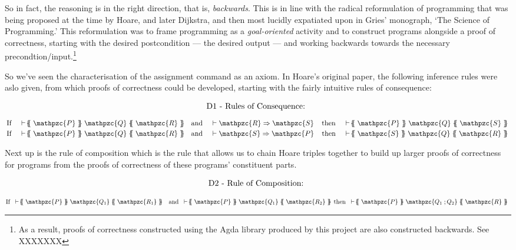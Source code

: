 \documentclass[oneside,12pt]{article}
\newcommand{\textM}[1]{\ensuremath{\mathpzc{#1}}}
\newcommand{\gtc}[3]{\!  \{\!\!\{ \; \textM{#1} \; \}\!\!\} \; \textM{#2} \;  \{\!\!\{ \; \textM{#3} \; \}\!\!\} \!}
\begin{document}
So in fact, the reasoning is in the right direction, that is, \emph{backwards}. This is in line with the radical reformulation of programming that was being proposed at the time by Hoare, and later Dijkstra, and then most lucidly expatiated upon in Gries' monograph\cite{Gries81}, `The Science of Programming.' This reformulation was to frame programming as a \emph{goal-oriented} activity and to construct programs alongside a proof of correctness, starting with the desired postcondition --- the desired output --- and working backwards towards the necessary precondtion/input.\footnote{As a result, proofs of correctness constructed using the Agda library produced by this project are also constructed backwards. See XXXXXXX}



So we've seen the characterisation of the assignment command as an axiom. In Hoare's original paper, the following inference rules were aslo given, from which proofs of correctness could be developed, starting with the fairly intuitive rules of consequence:

  
\begin{equation}
  \label{eq:D1}
  \begin{array}{c}
    \mbox{D1 - Rules of Consequence: } \hspace*{\fill} \\
  \end{array}
\end{equation}  $
  \begin{array}{c}
    \hspace{\textwidth} \vspace{-1em} \\      
    \mbox{\!\!If\;\;\;\;} \vdash \gtc{P}{Q}{R} \mbox{\;\;\;\;and\;\;\;\;} \vdash \textM{R} \Rightarrow \textM{S} \mbox{\;\;\;\;then\;\;\;\;} \vdash \gtc{P}{Q}{S}\\[0.25em]
    \mbox{\!\!If\;\;\;\;} \vdash \gtc{P}{Q}{R} \mbox{\;\;\;\;and\;\;\;\;} \vdash \textM{S} \Rightarrow \textM{P} \mbox{\;\;\;\;then\;\;\;\;} \vdash \gtc{S}{Q}{R}
  \end{array}
  $

\vspace{2em}

Next up is the rule of composition which is the rule that allows us to chain Hoare triples together to build up larger proofs of correctness for programs from the proofs of correctness of these programs' constituent parts.

  
\begin{equation}
  \label{eq:D2}
  \begin{array}{c}
    \mbox{D2 - Rule of Composition: } \hspace*{\fill} \\
  \end{array}
\end{equation}$
\begin{array}{c}
  \hspace{\textwidth} \vspace{-1em}\\
  \mbox{\!\!\!If\;\;} \vdash \gtc{P}{Q_1}{R_1} \mbox{\;\;\; and\;\;} \vdash \gtc{P}{Q_1}{R_2} \mbox{\;\;then\;\;} \vdash \gtc{P}{Q_1 \; ; Q_2}{R}
\end{array}$
\end{document}
